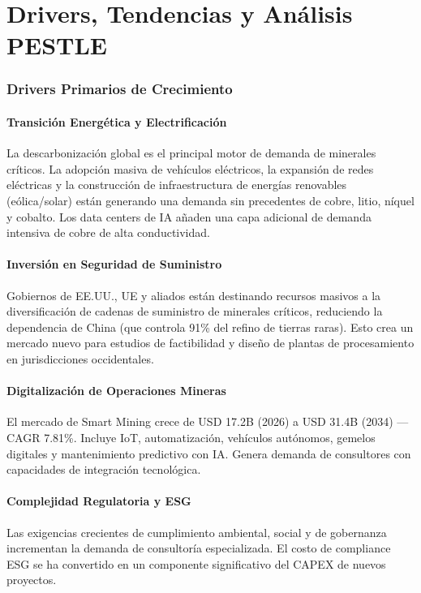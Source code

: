 \chapter{Drivers, Tendencias y Análisis PESTLE}

\subsection{Drivers Primarios de Crecimiento}

\subsubsection{Transición Energética y Electrificación}
La descarbonización global es el principal motor de demanda de minerales críticos. La adopción masiva de vehículos eléctricos, la expansión de redes eléctricas y la construcción de infraestructura de energías renovables (eólica/solar) están generando una demanda sin precedentes de cobre, litio, níquel y cobalto. Los data centers de IA añaden una capa adicional de demanda intensiva de cobre de alta conductividad.

\subsubsection{Inversión en Seguridad de Suministro}
Gobiernos de EE.UU., UE y aliados están destinando recursos masivos a la diversificación de cadenas de suministro de minerales críticos, reduciendo la dependencia de China (que controla 91\% del refino de tierras raras). Esto crea un mercado nuevo para estudios de factibilidad y diseño de plantas de procesamiento en jurisdicciones occidentales.

\subsubsection{Digitalización de Operaciones Mineras}
El mercado de Smart Mining crece de USD 17.2B (2026) a USD 31.4B (2034) — CAGR 7.81\%. Incluye IoT, automatización, vehículos autónomos, gemelos digitales y mantenimiento predictivo con IA. Genera demanda de consultores con capacidades de integración tecnológica.

\subsubsection{Complejidad Regulatoria y ESG}
Las exigencias crecientes de cumplimiento ambiental, social y de gobernanza incrementan la demanda de consultoría especializada. El costo de compliance ESG se ha convertido en un componente significativo del CAPEX de nuevos proyectos.

